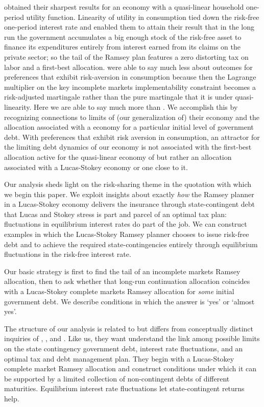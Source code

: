 \documentclass[12pt]{article}
\begin{document}
\citeauthor{Aiyagari2002} obtained their sharpest results for an economy with a quasi-linear household one-period utility function.
 Linearity of utility in consumption tied down the risk-free one-period interest rate and enabled them to attain their result that in the long run 
 the government accumulates a big enough stock of the risk-free asset  to finance its expenditures entirely from interest earned from its claims
 on the private sector; so the tail of the \citeauthor{Aiyagari2002}  Ramsey plan features a zero distorting tax on labor and a first-best allocation.
\citeauthor{Aiyagari2002} were able to say much less about outcomes for  preferences that exhibit risk-aversion in consumption because then the Lagrange multiplier
on the key incomplete markets implementability constraint becomes a risk-adjusted martingale rather than the pure martingale that it is under quasi-linearity. 
Here we are able to say much more  than \citeauthor{Aiyagari2002}. We accomplish this by recognizing connections to limits of (our generalization of)
their economy and the allocation associated with a \citeauthor{LucasJr.1983} economy for a particular initial level of government debt.
With preferences that exhibit risk aversion in consumption, an attractor for the limiting debt dynamics of our economy is not associated with  the first-best
allocation  active for the quasi-linear economy of \citeauthor{Aiyagari2002} but rather an allocation associated with a Lucas-Stokey economy or one close to it.

Our analysis sheds light on the risk-sharing theme in the quotation with which we begin this paper. We  exploit insights about exactly {\em how} the Ramsey planner
in a Lucas-Stokey economy delivers the insurance through state-contingent debt that Lucas and Stokey stress is part and parcel of an optimal tax plan:  
fluctuations in
 equilibrium interest rates do part of the job.  We can construct examples in which the Lucas-Stokey Ramsey planner chooses to issue risk-free debt and to
 achieve the required state-contingencies entirely through equilibrium fluctuations in the risk-free  interest rate.

Our basic strategy is first to find the tail of an   incomplete markets Ramsey allocation, 
then to ask whether that long-run continuation allocation coincides with a Lucas-Stokey complete markets Ramsey allocation for {\em some} initial government debt. 
We describe conditions in which the
answer is `yes' or `almost yes'.

The structure of our analysis is related to but differs from conceptually distinct  inquiries of \citet{Angeletos}, \citet{Buera_Nicolini}, and \citet{Shin2007}.
Like us, they  want understand the link among possible  limits on the state contingency  government  debt, interest rate fluctuations,  and an optimal tax and 
debt management plan. They  begin with a Lucas-Stokey complete market  
Ramsey allocation
and construct conditions under which it  can be supported by  a limited  collection of non-contingent debts of different maturities.
Equilibrium interest rate fluctuations
let state-contingent returns help.
\end{document}
